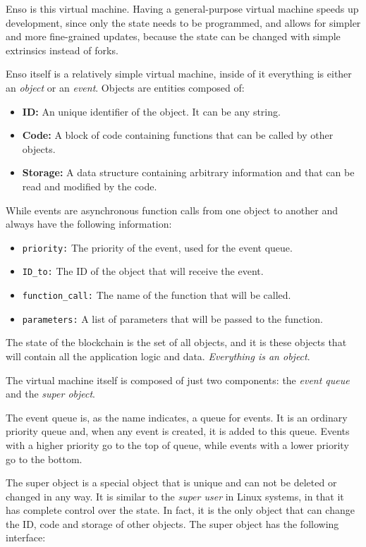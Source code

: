 \documentclass[conference]{IEEEtran}
\begin{document}
Enso is this virtual machine. Having a general-purpose virtual machine speeds up development, since only the state needs to be programmed, and allows for simpler and more fine-grained updates, because the state can be changed with simple extrinsics instead of forks.

Enso itself is a relatively simple virtual machine, inside of it everything is either an \textit{object} or an \textit{event}. Objects are entities composed of:

\begin{itemize}
	\item \textbf{ID:} An unique identifier of the object. It can be any string.
	\item \textbf{Code:} A block of code containing functions that can be called by other objects.
	\item \textbf{Storage:} A data structure containing arbitrary information and that can be read and modified by the code.
\end{itemize}

While events are asynchronous function calls from one object to another and always have the following information:

\begin{itemize}
	\item \texttt{priority:} The priority of the event, used for the event queue.
	\item \texttt{ID\_to:} The ID of the object that will receive the event.
	\item \texttt{function\_call:} The name of the function that will be called.
	\item \texttt{parameters:} A list of parameters that will be passed to the function.
\end{itemize}

The state of the blockchain is the set of all objects, and it is these objects that will contain all the application logic and data. \textit{Everything is an object}.

The virtual machine itself is composed of just two components: the \textit{event queue} and the \textit{super object}.

The event queue is, as the name indicates, a queue for events. It is an ordinary priority queue and, when any event is created, it is added to this queue. Events with a higher priority go to the top of queue, while events with a lower priority go to the bottom.

The super object is a special object that is unique and can not be deleted or changed in any way. It is similar to the \textit{super user} in Linux systems, in that it has complete control over the state. In fact, it is the only object that can change the ID, code and storage of other objects. The super object has the following interface:
\end{document}
